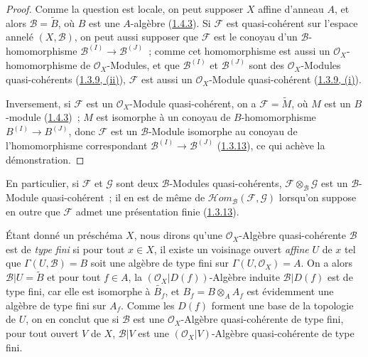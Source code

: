 \begin{proof}
Comme la question est locale, on peut supposer $X$ affine d'anneau $A$, et
alors $\mathscr{B}=\widetilde{B}$, où $B$ est une $A$-algèbre
(\hyperref[I.1.4.3-fr]{1.4.3}). Si $\mathscr{F}$ est quasi-cohérent sur
l'espace annelé $(X,\mathscr{B})$, on peut aussi supposer que
$\mathscr{F}$ est le conoyau d'un $\mathscr{B}$-homomorphisme
$\mathscr{B}^{(I)}\to\mathscr{B}^{(J)}$~; comme cet homomorphisme est
aussi un $\mathscr{O}_X$-homomorphisme de $\mathscr{O}_X$-Modules, et que
$\mathscr{B}^{(I)}$ et $\mathscr{B}^{(J)}$ sont des
$\mathscr{O}_X$-Modules quasi-cohérents
(\hyperref[I.1.3.9-fr]{1.3.9, (ii)}), $\mathscr{F}$ est aussi un
$\mathscr{O}_X$-Module quasi-cohérent
(\hyperref[I.1.3.9-fr]{1.3.9, (i)}).

Inversement, si $\mathscr{F}$ est un $\mathscr{O}_X$-Module
quasi-cohérent, on a $\mathscr{F}=\widetilde{M}$, où $M$ est un $B$-module
(\hyperref[I.1.4.3-fr]{1.4.3})~; $M$ est isomorphe à un conoyau de
$B$-homomorphisme $B^{(I)}\to B^{(J)}$, donc $\mathscr{F}$ est un
$\mathscr{B}$-Module isomorphe au conoyau de l'homomorphisme correspondant
$\mathscr{B}^{(I)}\to\mathscr{B}^{(J)}$
(\hyperref[I.1.3.13-fr]{1.3.13}), ce qui achève la démonstration.
\end{proof}

En particulier, si $\mathscr{F}$ et $\mathscr{G}$ sont deux
$\mathscr{B}$-Modules quasi-cohérents,
$\mathscr{F}\otimes_{\mathscr{B}}\mathscr{G}$ est un
$\mathscr{B}$-Module quasi-cohérent~; il en est de même de
$\mathscr{H}\!om_{\mathscr{B}}(\mathscr{F},\mathscr{G})$ lorsqu'on
suppose en outre que $\mathscr{F}$ admet une présentation finie
(\hyperref[I.1.3.13-fr]{1.3.13}).

\begin{env}[9.6.2]
\label{I.9.6.2-fr}
Étant donné un préschéma $X$, nous dirons qu'une
$\mathscr{O}_X$-Algèbre quasi-cohérente $\mathscr{B}$ est de
\emph{type fini} si pour tout $x\in X$, il existe un voisinage ouvert
\emph{affine} $U$ de $x$ tel que $\Gamma(U,\mathscr{B})=B$ soit une
algèbre de type fini sur $\Gamma(U,\mathscr{O}_X)=A$. On a alors
$\mathscr{B}|U=\widetilde{B}$ et pour tout $f\in A$, la
$(\mathscr{O}_X|D(f))$-Algèbre induite $\mathscr{B}|D(f)$ est de type
fini, car elle est isomorphe à $\widetilde{B_f}$, et
$B_f=B\otimes_A A_f$ est évidemment une algèbre de type fini sur $A_f$.
Comme les $D(f)$ forment une base de la topologie de $U$, on en conclut que
si $\mathscr{B}$ est une $\mathscr{O}_X$-Algèbre quasi-cohérente de type
fini, pour tout ouvert $V$ de $X$, $\mathscr{B}|V$ est une
$(\mathscr{O}_X|V)$-Algèbre quasi-cohérente de type fini.
\end{env}

